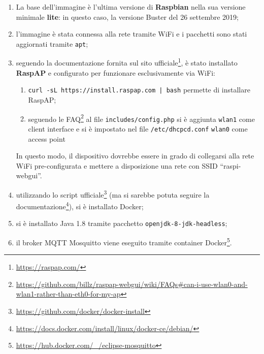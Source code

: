   \begin{enumerate}
    \item
      La base dell'immagine è l'ultima versione di \textbf{Raspbian} nella sua versione minimale \textbf{lite}:
      in questo caso, la versione Buster del 26 settembre 2019;
    \item
      l'immagine è stata connessa alla rete tramite WiFi e i pacchetti sono stati aggiornati tramite \texttt{apt};
    \item
      seguendo la documentazione fornita sul sito ufficiale\footnote{\url{https://raspap.com/}},
      è stato installato \textbf{RaspAP} e configurato per funzionare esclusivamente via WiFi:
      \begin{enumerate}
        \item
          \texttt{curl -sL https://install.raspap.com | bash} permette di installare RaspAP\@;
        \item
          seguendo le FAQ\footnote{\url{https://github.com/billz/raspap-webgui/wiki/FAQs\#can-i-use-wlan0-and-wlan1-rather-than-eth0-for-my-ap}}
          al file \texttt{includes/config.php} si è aggiunta \texttt{wlan1} come client interface e si è impostato nel file \texttt{/etc/dhcpcd.conf}
          \texttt{wlan0} come access point
      \end{enumerate}
      In questo modo, il dispositivo dovrebbe essere in grado di collegarsi alla rete WiFi pre-configurata e mettere a disposizione una rete con SSID ``raspi-webgui''.
    \item
      utilizzando lo script ufficiale\footnote{\url{https://github.com/docker/docker-install}}
      (ma si sarebbe potuta seguire la documentazione\footnote{\url{https://docs.docker.com/install/linux/docker-ce/debian/}}), si è installato Docker;
    \item
      si è installato Java 1.8 tramite pacchetto \texttt{openjdk-8-jdk-headless};
    \item
      il broker MQTT Mosquitto viene eseguito tramite container Docker\footnote{\url{https://hub.docker.com/_/eclipse-mosquitto}}.
  \end{enumerate}
